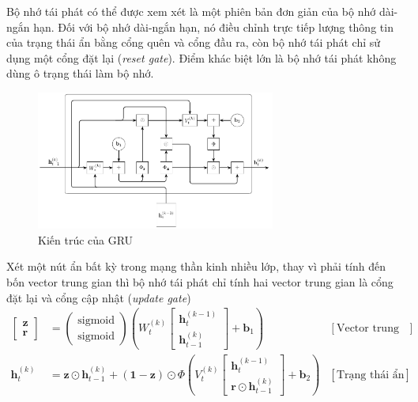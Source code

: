Bộ nhớ tái phát có thể được xem xét là một phiên bản đơn giản của bộ nhớ dài-ngắn hạn. Đối với bộ nhớ dài-ngắn hạn, nó điều chỉnh trực tiếp lượng thông tin của trạng thái ẩn bằng cổng quên và cổng đầu ra, còn bộ nhớ tái phát chỉ sử dụng một cổng đặt lại (\textit{reset gate}). Điểm khác biệt lớn là bộ nhớ tái phát không dùng ô trạng thái làm bộ nhớ.
\begin{figure}[htb]
    \centering
    \includegraphics[width=0.7\textwidth]{tikz_image/gru_architecture.pdf}
    \caption{Kiến trúc của GRU}
    \label{fig:gru-architecture}
\end{figure}

Xét một nút ẩn bất kỳ trong mạng thần kinh nhiều lớp, thay vì phải tính đến bốn vector trung gian thì bộ nhớ tái phát chỉ tính hai vector trung gian là cổng đặt lại và cổng cập nhật (\textit{update gate})
\begin{align}
    \begin{bmatrix}
        \mathbf z \\
        \mathbf r
    \end{bmatrix}
     & =
    \begin{pmatrix}
        \text{sigmoid} \\
        \text{sigmoid}
    \end{pmatrix}
    \left(W^{(k)}_t
    \begin{bmatrix}
            \mathbf h_{t}^{(k-1)} \\
            \mathbf h_{t-1}^{(k)}
        \end{bmatrix}
    +\mathbf b_1\right)
     & [\text{Vector trung gian}]                                          \\
    \mathbf h_t^{(k)}
     & =\mathbf z\odot\mathbf h_{t-1}^{(k)}+(\mathbf 1-\mathbf z)\odot\Phi
    \left(V^{(k)}_t
    \begin{bmatrix}
            \mathbf h_{t}^{(k-1)} \\
            \mathbf r\odot\mathbf h_{t-1}^{(k)}
        \end{bmatrix}
    +\mathbf b_2\right)
     & [\text{Trạng thái ẩn}]
\end{align}

